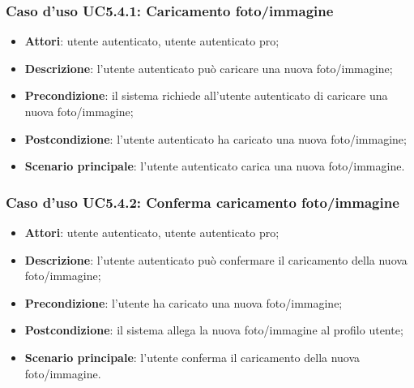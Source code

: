 \subsubsection{Caso d'uso UC5.4.1: Caricamento foto/immagine}

\begin{itemize}
	\item \textbf{Attori}: utente autenticato, utente autenticato pro;
	\item \textbf{Descrizione}: l'utente autenticato può caricare una nuova foto/immagine;
	\item \textbf{Precondizione}: il sistema richiede all'utente autenticato di caricare una nuova foto/immagine;
	\item \textbf{Postcondizione}: l'utente autenticato ha caricato una nuova foto/immagine;
	\item \textbf{Scenario principale}: l'utente autenticato carica una nuova foto/immagine.
\end{itemize}

\subsubsection{Caso d'uso UC5.4.2: Conferma caricamento foto/immagine}

\begin{itemize}
	\item \textbf{Attori}: utente autenticato, utente autenticato pro;
	\item \textbf{Descrizione}: l'utente autenticato può confermare il caricamento della nuova foto/immagine;
	\item \textbf{Precondizione}: l'utente ha caricato una nuova foto/immagine;
	\item \textbf{Postcondizione}: il sistema allega la nuova foto/immagine al profilo utente;
	\item \textbf{Scenario principale}: l'utente conferma il caricamento della nuova foto/immagine.
\end{itemize}


